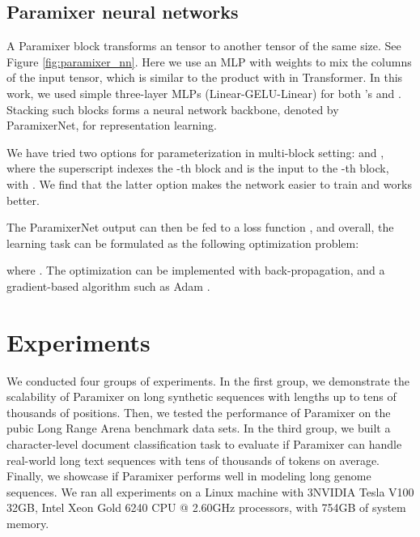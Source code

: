 \documentclass{article}
\begin{document}
\subsection{Paramixer neural networks}
\label{sec:paramixer_nn}
A Paramixer block transforms an  tensor  to another tensor of the same size. See Figure \ref{fig:paramixer_nn}. Here we use an MLP  with weights  to mix the columns of the input tensor, which is similar to the product with  in Transformer. In this work, we used simple three-layer MLPs (Linear-GELU-Linear) for both 's and . Stacking  such blocks forms a neural network backbone, denoted by ParamixerNet, for representation learning. 

We have tried two options for parameterization in multi-block setting:  and , where the superscript  indexes the -th block and  is the input to the -th block, with . We find that the latter option makes the network easier to train and works better.

The ParamixerNet output can then be fed to a loss function , and overall, the learning task can be formulated as the following optimization problem:

where .
The optimization can be implemented with back-propagation, and a gradient-based algorithm such as Adam \cite{adam}.


\section{Experiments}
\label{sec:exps}
We conducted four groups of experiments. In the first group, we demonstrate the scalability of Paramixer on long synthetic sequences with lengths up to tens of thousands of positions. Then, we tested the performance of Paramixer on the pubic Long Range Arena benchmark data sets. In the third group, we built a character-level document classification task to evaluate if Paramixer can handle real-world long text sequences with tens of thousands of tokens on average. Finally, we showcase if Paramixer performs well in modeling long genome sequences. We ran all experiments on a Linux machine with 3NVIDIA Tesla V100 32GB, Intel Xeon Gold 6240 CPU @ 2.60GHz processors, with 754GB of system memory. 
\end{document}

